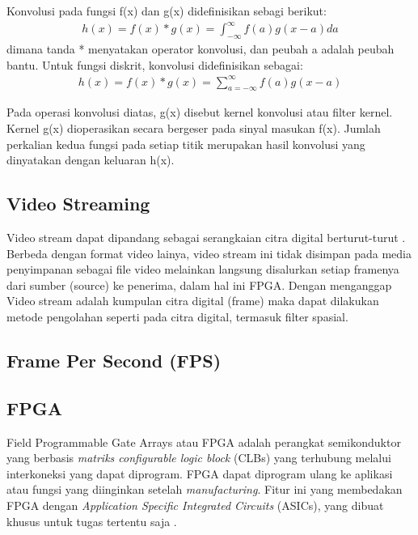 Konvolusi pada fungsi f(x) dan g(x) didefinisikan sebagi berikut:
\begin{equation}
    \label{eq:conv1}
    \begin{split}
        h(x) = f(x) * g(x) = \int_{-\infty}^{\infty} f(a)g(x-a) da
    \end{split}
\end{equation}
dimana tanda * menyatakan operator konvolusi, dan peubah a adalah peubah bantu. Untuk fungsi diskrit, konvolusi didefinisikan sebagai:
\begin{equation}
    \label{eq:conv2}
    \begin{split}
         h(x) = f(x) * g(x) = \sum_{a=-\infty}^{\infty} f(a)g(x-a)
    \end{split}
\end{equation}

Pada operasi konvolusi diatas, g(x) disebut kernel konvolusi atau filter kernel. Kernel g(x) dioperasikan secara bergeser pada sinyal masukan f(x). Jumlah perkalian kedua fungsi pada setiap titik merupakan hasil konvolusi yang dinyatakan dengan keluaran h(x).


\subsection{Video Streaming}
Video stream dapat dipandang sebagai serangkaian citra digital berturut-turut . Berbeda dengan format video lainya, video stream ini tidak disimpan pada media penyimpanan sebagai file video melainkan langsung disalurkan setiap framenya dari sumber (source) ke penerima, dalam hal ini FPGA.  Dengan menganggap Video stream adalah kumpulan citra digital (frame) maka dapat dilakukan metode pengolahan seperti pada citra digital, termasuk filter spasial. 

\subsection{Frame Per Second (FPS)}


\subsection{FPGA}
Field Programmable Gate Arrays atau FPGA adalah perangkat semikonduktor yang berbasis \textit{matriks configurable logic block} (CLBs) yang terhubung melalui interkoneksi yang dapat diprogram. FPGA dapat diprogram ulang ke aplikasi atau fungsi yang diinginkan setelah \textit{manufacturing}. Fitur ini yang membedakan FPGA dengan \textit{Application Specific Integrated Circuits} (ASICs), yang dibuat khusus untuk tugas tertentu saja .

